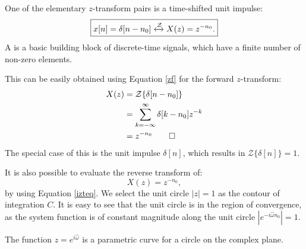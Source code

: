 One of the elementary $z$-transform pairs is a time-shifted unit impulse:
\begin{equation}
  \boxed{
    x[n]=\delta[n-n_0] \xleftrightarrow{\mathcal{Z}} X(z) = z^{-n_0}.
      \label{eq:z_shifted_unit_impulse}
  }
\end{equation}
A  is a
basic building block of discrete-time signals, which have a finite
number of non-zero elements.

This can be easily obtained using Equation \ref{zf} for the forward $z$-transform:
\begin{align}
X(z) &= \mathcal{Z}\{\delta[n-n_0]\} \\
     &= \sum_{k=-\infty}^{\infty} \delta[k-n_0] z^{-k}\\
     &= z^{-n_0}\qed
\end{align}
The special case of this is the unit impulse $\delta[n]$, which
results in $\mathcal{Z}\{\delta[n]\}=1$.


It is also possible to evaluate the reverse transform of:
\begin{equation}
  X(z)=z^{-n_0},
\end{equation}
by using Equation \ref{izteq}. We select the unit circle $|z|=1$ as
the contour of integration $C$. It is easy to see that the unit circle
is in the region of convergence, as the system function is of constant
magnitude along the unit circle $|e^{-i\hat{\omega}n_0}|=1$.

\begin{marginfigure}
\begin{center}
\end{center}
\caption{The function $z=e^{i\hat{\omega}}$ is a parametric curve for a circle on the complex plane.}
\end{marginfigure}

